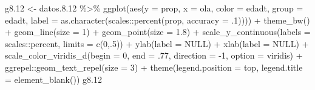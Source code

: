 \documentclass[
  12pt,
]{book}
\newenvironment{Shaded}{\begin{snugshade}}{\end{snugshade}}
\newcommand{\AttributeTok}[1]{\textcolor[rgb]{0.77,0.63,0.00}{#1}}
\newcommand{\ConstantTok}[1]{\textcolor[rgb]{0.00,0.00,0.00}{#1}}
\newcommand{\DecValTok}[1]{\textcolor[rgb]{0.00,0.00,0.81}{#1}}
\newcommand{\FloatTok}[1]{\textcolor[rgb]{0.00,0.00,0.81}{#1}}
\newcommand{\FunctionTok}[1]{\textcolor[rgb]{0.00,0.00,0.00}{#1}}
\newcommand{\NormalTok}[1]{#1}
\newcommand{\OtherTok}[1]{\textcolor[rgb]{0.56,0.35,0.01}{#1}}
\newcommand{\SpecialCharTok}[1]{\textcolor[rgb]{0.00,0.00,0.00}{#1}}
\newcommand{\StringTok}[1]{\textcolor[rgb]{0.31,0.60,0.02}{#1}}
\begin{document}
\begin{Shaded}
\begin{Highlighting}[]
\NormalTok{g8}\FloatTok{.12} \OtherTok{\textless{}{-}}\NormalTok{ datos.}\FloatTok{8.12} \SpecialCharTok{\%\textgreater{}\%} 
  \FunctionTok{ggplot}\NormalTok{(}\FunctionTok{aes}\NormalTok{(}\AttributeTok{y =}\NormalTok{ prop, }\AttributeTok{x =}\NormalTok{ ola, }\AttributeTok{color =}\NormalTok{ edadt, }\AttributeTok{group =}\NormalTok{ edadt,}
             \AttributeTok{label =} \FunctionTok{as.character}\NormalTok{(scales}\SpecialCharTok{::}\FunctionTok{percent}\NormalTok{(prop, }\AttributeTok{accuracy =}\NormalTok{ .}\DecValTok{1}\NormalTok{)))) }\SpecialCharTok{+}
  \FunctionTok{theme\_bw}\NormalTok{() }\SpecialCharTok{+}   
  \FunctionTok{geom\_line}\NormalTok{(}\AttributeTok{size =} \DecValTok{1}\NormalTok{) }\SpecialCharTok{+}
  \FunctionTok{geom\_point}\NormalTok{(}\AttributeTok{size =} \FloatTok{1.8}\NormalTok{) }\SpecialCharTok{+}
  \FunctionTok{scale\_y\_continuous}\NormalTok{(}\AttributeTok{labels =}\NormalTok{ scales}\SpecialCharTok{::}\NormalTok{percent,}
                     \AttributeTok{limits =} \FunctionTok{c}\NormalTok{(}\DecValTok{0}\NormalTok{,.}\DecValTok{5}\NormalTok{)) }\SpecialCharTok{+}
  \FunctionTok{ylab}\NormalTok{(}\AttributeTok{label =} \ConstantTok{NULL}\NormalTok{) }\SpecialCharTok{+}
  \FunctionTok{xlab}\NormalTok{(}\AttributeTok{label =} \ConstantTok{NULL}\NormalTok{) }\SpecialCharTok{+}
  \FunctionTok{scale\_color\_viridis\_d}\NormalTok{(}\AttributeTok{begin =} \DecValTok{0}\NormalTok{, }\AttributeTok{end =}\NormalTok{ .}\DecValTok{77}\NormalTok{, }\AttributeTok{direction =} \SpecialCharTok{{-}}\DecValTok{1}\NormalTok{, }\AttributeTok{option =} \StringTok{\textquotesingle{}viridis\textquotesingle{}}\NormalTok{) }\SpecialCharTok{+}
\NormalTok{  ggrepel}\SpecialCharTok{::}\FunctionTok{geom\_text\_repel}\NormalTok{(}\AttributeTok{size =} \DecValTok{3}\NormalTok{) }\SpecialCharTok{+}
  \FunctionTok{theme}\NormalTok{(}\AttributeTok{legend.position =} \StringTok{\textquotesingle{}top\textquotesingle{}}\NormalTok{,}
        \AttributeTok{legend.title =} \FunctionTok{element\_blank}\NormalTok{())}
\NormalTok{g8}\FloatTok{.12}
\end{Highlighting}
\end{Shaded}
\end{document}
